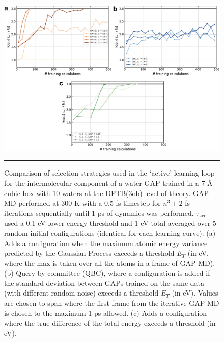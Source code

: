 \documentclass[../../main.tex]{subfiles}
\newcommand{\taua}{$\tau_\text{acc}$ }
\begin{document}
\begin{figure}[h!]
	\vspace{0.4cm}
	\centering
	\includegraphics[width=\textwidth]{6/gap/figs_si/fig25}
	\vspace{0.2cm}
	\hrule
	\caption{Comparison of selection strategies used in the ‘active’ learning loop for the intermolecular component of a water GAP trained in a 7 \AA$\;$cubic box with 10 waters at the DFTB(3ob) level of theory. GAP-MD performed at 300 K with a 0.5 fs timestep for $n^3+2$ fs iterations sequentially until 1 ps of dynamics was performed. \taua used a 0.1 eV lower energy threshold and 1 eV total averaged over 5 random initial configurations (identical for each learning curve). (a) Adds a configuration when the maximum atomic energy variance predicted by the Gaussian Process exceeds a threshold $E_T$ (in eV, where the max is taken over all the atoms in a frame of GAP-MD). (b) Query-by-committee (QBC), where a configuration is added if the standard deviation between GAPs trained on the same data (with different random noise) exceeds a threshold $E_T$ (in eV). Values are chosen to span where the first frame from the iterative GAP-MD is chosen to the maximum 1 ps allowed. (c) Adds a configuration where the true difference of the total energy exceeds a threshold (in eV).}
	\label{fig::ml_si_25}
\end{figure}








\clearpage
\end{document}

